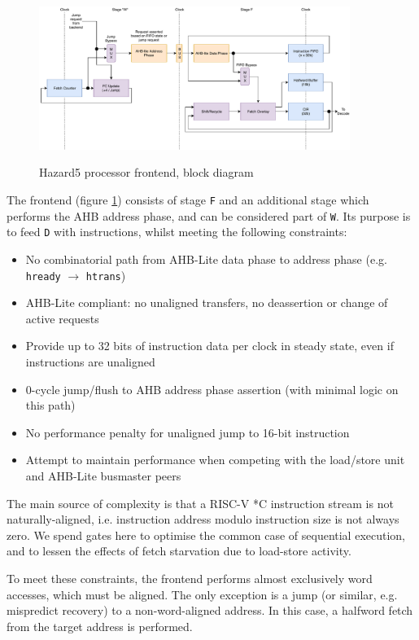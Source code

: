 \documentclass[notitlepage]{article}
\begin{document}
\begin{figure}[!htb]
\centering
\caption{Hazard5 processor frontend, block diagram}
\includegraphics[width=0.9\textwidth]{diagrams/cpu_frontend.pdf}
\label{diagram:frontend}
\end{figure}

The frontend (figure \ref{diagram:frontend}) consists of stage {\tt F} and an additional stage which performs the AHB address phase, and can be considered part of {\tt W}. Its purpose is to feed {\tt D} with instructions, whilst meeting the following constraints:

\begin{itemize}
	\item No combinatorial path from AHB-Lite data phase to address phase (e.g. {\tt hready} $\to$ {\tt htrans})
	\item AHB-Lite compliant: no unaligned transfers, no deassertion or change of active requests
	\item Provide up to 32 bits of instruction data per clock in steady state, even if instructions are unaligned
	\item 0-cycle jump/flush to AHB address phase assertion (with minimal logic on this path)
	\item No performance penalty for unaligned jump to 16-bit instruction
	\item Attempt to maintain performance when competing with the load/store unit and AHB-Lite busmaster peers
\end{itemize}

The main source of complexity is that a RISC-V *C instruction stream is not naturally-aligned, i.e. instruction address modulo instruction size is not always zero. We spend gates here to optimise the common case of sequential execution, and to lessen the effects of fetch starvation due to load-store activity.

To meet these constraints, the frontend performs almost exclusively word accesses, which must be aligned. The only exception is a jump (or similar, e.g. mispredict recovery) to a non-word-aligned address. In this case, a halfword fetch from the target address is performed.
\end{document}
